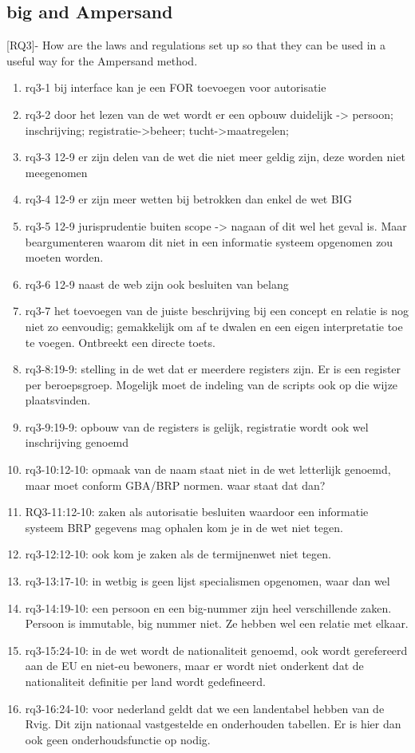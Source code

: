 \subsection{\acrlong{big} and Ampersand}
[RQ3]- How are the laws and regulations set up so that they can be used in a useful way for the Ampersand method.
\begin{enumerate}
    \item rq3-1 bij interface kan je een FOR toevoegen voor autorisatie
    \item rq3-2 door het lezen van de wet wordt er een opbouw duidelijk -> persoon; inschrijving; registratie->beheer; tucht->maatregelen; 
    \item rq3-3 12-9 er zijn delen van de wet die niet meer geldig zijn, deze worden niet meegenomen
    \item rq3-4 12-9 er zijn meer wetten bij betrokken dan enkel de wet BIG
    \item rq3-5 12-9 jurisprudentie buiten scope -> nagaan of dit wel het geval is. Maar beargumenteren waarom dit niet in een informatie systeem opgenomen zou moeten worden.
    \item rq3-6 12-9 naast de web zijn ook besluiten van belang
    \item rq3-7 het toevoegen van de juiste beschrijving bij een concept en relatie is nog niet zo eenvoudig; gemakkelijk om af te dwalen en een eigen interpretatie toe te voegen. Ontbreekt een directe toets.
    \item rq3-8:19-9: stelling in de wet dat er meerdere registers zijn. Er is een register per beroepsgroep. Mogelijk moet de indeling van de scripts ook op die wijze plaatsvinden.
    \item rq3-9:19-9: opbouw van de registers is gelijk, registratie wordt ook wel inschrijving genoemd
    \item rq3-10:12-10: opmaak van de naam staat niet in de wet letterlijk genoemd, maar moet conform GBA/BRP normen. waar staat dat dan?
    \item RQ3-11:12-10: zaken als autorisatie besluiten waardoor een informatie systeem BRP gegevens mag ophalen kom je in de wet niet tegen.
    \item rq3-12:12-10: ook kom je zaken als de termijnenwet niet tegen. 
    \item rq3-13:17-10: in wetbig is geen lijst specialismen opgenomen, waar dan wel
    \item rq3-14:19-10: een persoon en een big-nummer zijn heel verschillende zaken. Persoon is immutable, big nummer niet. Ze hebben wel een relatie met elkaar.
    \item rq3-15:24-10: in de wet wordt de nationaliteit genoemd, ook wordt gerefereerd aan de EU en niet-eu bewoners, maar er wordt niet onderkent dat de nationaliteit definitie per land wordt gedefineerd.
    \item rq3-16:24-10: voor nederland geldt dat we een landentabel hebben van de Rvig. Dit zijn nationaal vastgestelde en onderhouden tabellen. Er is hier dan ook geen onderhoudsfunctie op nodig.
\end{enumerate}